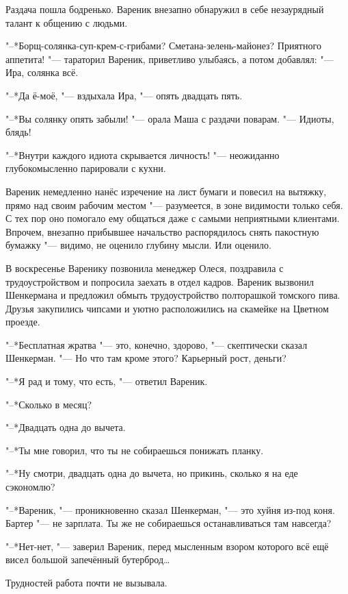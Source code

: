 Раздача пошла бодренько.
Вареник внезапно обнаружил в себе незаурядный талант к общению с людьми.

"--*Борщ-солянка-суп-крем-с-грибами?
Сметана-зелень-майонез?
Приятного аппетита! "--- тараторил Вареник, приветливо улыбаясь, а потом добавлял:
"--- Ира, солянка всё.

"--*Да ё-моё, "--- вздыхала Ира, "--- опять двадцать пять.

"--*Вы солянку опять забыли! "--- орала Маша с раздачи поварам.
"--- Идиоты, блядь!

"--*Внутри каждого идиота скрывается личность! "--- неожиданно глубокомысленно парировали с кухни.

Вареник немедленно нанёс изречение на лист бумаги и повесил на вытяжку, прямо над своим рабочим местом "--- разумеется, в зоне видимости только себя.
С тех пор оно помогало ему общаться даже с самыми неприятными клиентами.
Впрочем, внезапно прибывшее начальство распорядилось снять пакостную бумажку "--- видимо, не оценило глубину мысли.
Или оценило.

\asterism

\label{Sun_2012_04_29}

В воскресенье Варенику позвонила менеджер Олеся, поздравила с трудоустройством и попросила заехать в отдел кадров.
Вареник вызвонил Шенкермана и предложил обмыть трудоустройство полторашкой томского пива.
Друзья закупились чипсами и уютно расположились на скамейке на Цветном проезде.

"--*Бесплатная жратва "--- это, конечно, здорово, "--- скептически сказал Шенкерман.
"--- Но что там кроме этого?
Карьерный рост, деньги?

"--*Я рад и тому, что есть, "--- ответил Вареник.

"--*Сколько в месяц?

"--*Двадцать одна до вычета.

"--*Ты мне говорил, что ты не собираешься понижать планку.

"--*Ну смотри, двадцать одна до вычета, но прикинь, сколько я на еде сэкономлю?

"--*Вареник, "--- проникновенно сказал Шенкерман, "--- это хуйня из-под коня.
Бартер "--- не зарплата.
Ты же не собираешься останавливаться там навсегда?

"--*Нет-нет, "--- заверил Вареник, перед мысленным взором которого всё ещё висел большой запечённый бутерброд\ldots{}

Трудностей работа почти не вызывала.

